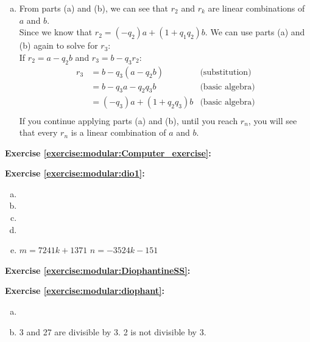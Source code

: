 \begin{enumerate}[(a)]
\item
From parts (a) and (b), we can see that $r_{2}$ and $r_{k}$ are linear combinations of $a$ and $b$.\\
Since we know that $r_{2} = (-q_{2})a + (1 + q_{1}q_{2})b$. We can use parts (a) and (b) again to solve for $r_{3}$:\\
If $r_{2} = a - q_{2}b$ and $r_{3} = b - q_{3}r_{2}$:
\begin{align*}
r_{3} &= b - q_{3}(a - q_{2}b) &\text{(substitution)}\\
&= b - q_{3}a - q_{2}q_{3}b &\text{(basic algebra)}\\
&= (-q_{3})a + (1 + q_{2}q_{3})b &\text{(basic algebra)}\\
\end{align*}
If you continue applying parts (a) and (b), until you reach $r_{n}$, you will see that every $r_{n}$ is a linear combination of $a$ and $b$.
\end{enumerate}

\noindent\textbf{Exercise \ref{exercise:modular:Computer_exercise}:}

\noindent\textbf{Exercise \ref{exercise:modular:dio1}:} 
\begin{enumerate} [(a)]
\item
\item
\item
\item
\item
$m=7241k+1371$ $n=-3524k-151$
\end {enumerate}

\noindent\textbf{Exercise \ref{exercise:modular:DiophantineSS}:}

\noindent\textbf{Exercise \ref{exercise:modular:diophant}:}
\begin{enumerate} [(a)]
\item
\item
3 and 27 are divisible by 3. 2 is not divisible by 3.
\end {enumerate}

